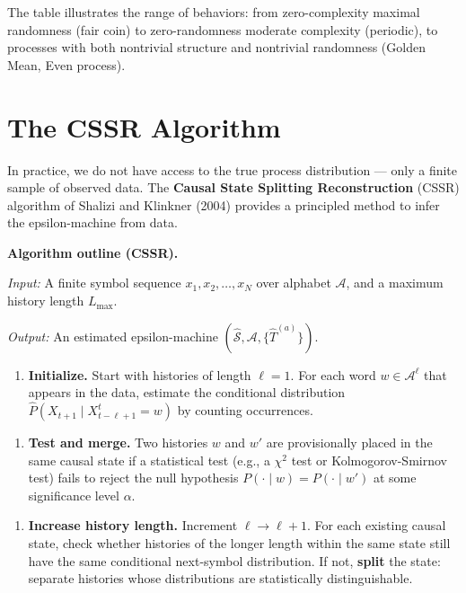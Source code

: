 The table illustrates the range of behaviors: from zero-complexity maximal randomness (fair coin) to zero-randomness moderate complexity (periodic), to processes with both nontrivial structure and nontrivial randomness (Golden Mean, Even process).



\section{The CSSR Algorithm}

In practice, we do not have access to the true process distribution --- only a finite sample of observed data. The \textbf{Causal State Splitting Reconstruction} (CSSR) algorithm of Shalizi and Klinkner (2004) provides a principled method to infer the epsilon-machine from data.

\textbf{Algorithm outline (CSSR).}

\textit{Input:} A finite symbol sequence $x_1, x_2, \ldots, x_N$ over alphabet $\mathcal{A}$, and a maximum history length $L_{\max}$.

\textit{Output:} An estimated epsilon-machine $(\hat{\mathcal{S}}, \mathcal{A}, \{ \hat{T}^{(a)}\} )$.

\begin{enumerate}
\item \textbf{Initialize.} Start with histories of length $\ell = 1$. For each word $w \in \mathcal{A}^\ell$ that appears in the data, estimate the conditional distribution $\hat{P}(X_{t+1} \mid X_{t-\ell+1}^{t} = w)$ by counting occurrences.
\end{enumerate}

\begin{enumerate}
\item \textbf{Test and merge.} Two histories $w$ and $w'$ are provisionally placed in the same causal state if a statistical test (e.g., a $\chi^2$ test or Kolmogorov-Smirnov test) fails to reject the null hypothesis $P(\cdot \mid w) = P(\cdot \mid w')$ at some significance level $\alpha$.
\end{enumerate}

\begin{enumerate}
\item \textbf{Increase history length.} Increment $\ell \to \ell + 1$. For each existing causal state, check whether histories of the longer length within the same state still have the same conditional next-symbol distribution. If not, \textbf{split} the state: separate histories whose distributions are statistically distinguishable.
\end{enumerate}

